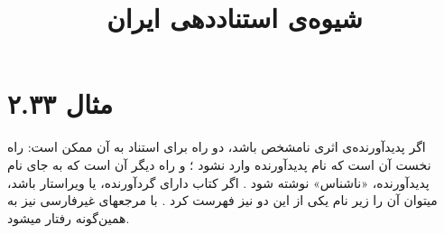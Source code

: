 \documentclass[a4paper,10pt]{article}
\begin{document}
\title{شیوه‌ی استناددهی ایران}
\author{}
\date{}
\maketitle



\section*{مثال ۲.۳۳}

اگر پدیدآورنده‌ی اثری نامشخص باشد، دو راه برای استناد به آن ممکن است: راه نخست آن است که نام پدیدآورنده وارد نشود \cite[مانند][]{هزارویک1378}؛ و راه دیگر آن است که به جای نام پدیدآورنده، «ناشناس» نوشته شود \cite[مانند][]{ناشناس1378,ناشناس1362}. اگر کتاب دارای گردآورنده، یا ویراستار باشد، میتوان آن را زیر نام یکی از این دو نیز فهرست کرد \cite[مانند][]{افراسیابی1378}. با مرجعهای غیرفارسی نیز به همین‌گونه رفتار میشود.
\nocite{*}






\end{document}
